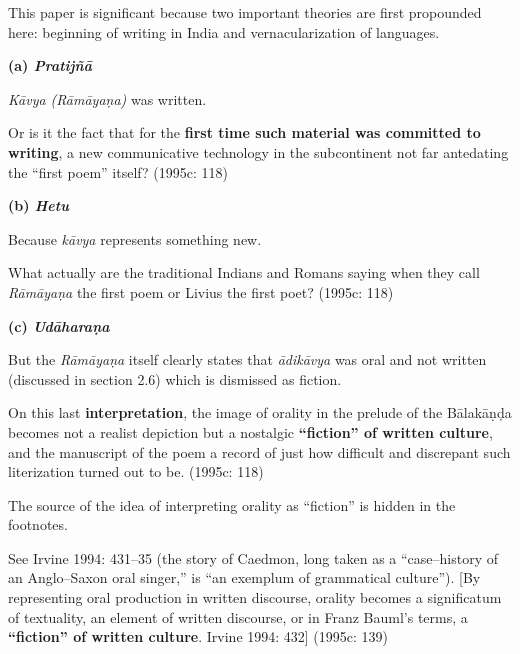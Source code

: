 \vspace{-.2cm}

This paper is significant because two important theories are first propounded here: beginning of writing in India and vernacularization of languages.

\textbf{(a) \textit{Pratijñā}}

\textit{Kāvya (Rāmāyaṇa)} was written.

\begin{myquote}
Or is it the fact that for the \textbf{first time such material was committed to writing}, a new communicative technology in the subcontinent not far antedating the “first poem” itself? (1995c: 118)
\end{myquote}

\textbf{(b) \textit{Hetu}}

Because\textit{ kāvya} represents something new.

\begin{myquote}
What actually are the traditional Indians and Romans saying when they call \textit{Rāmāyaṇa} the first poem or Livius the first poet? (1995c: 118)
\end{myquote}

\textbf{(c) \textit{Udāharaṇa}}

But the \textit{Rāmāyaṇa }itself clearly states that \textit{ādikāvya} was oral and not written (discussed in section 2.6) which is dismissed as fiction.

\begin{myquote}
On this last \textbf{interpretation}, the image of orality in the prelude of the Bālakāṇḍa becomes not a realist depiction but a nostalgic \textbf{“fiction” of written culture}, and the manuscript of the poem a record of just how difficult and discrepant such literization turned out to be. (1995c: 118)
\end{myquote}

The source of the idea of interpreting orality as “fiction” is hidden in the footnotes.

\begin{myquote}
See Irvine 1994: 431–35 (the story of Caedmon, long taken as a “case–history of an Anglo–Saxon oral singer,” is ``an exemplum of grammatical culture”). [By representing oral production in written discourse, orality becomes a significatum of textuality, an element of written discourse, or in Franz Bauml’s terms, a \textbf{“fiction” of written culture}. Irvine 1994: 432] (1995c: 139)
\end{myquote}

